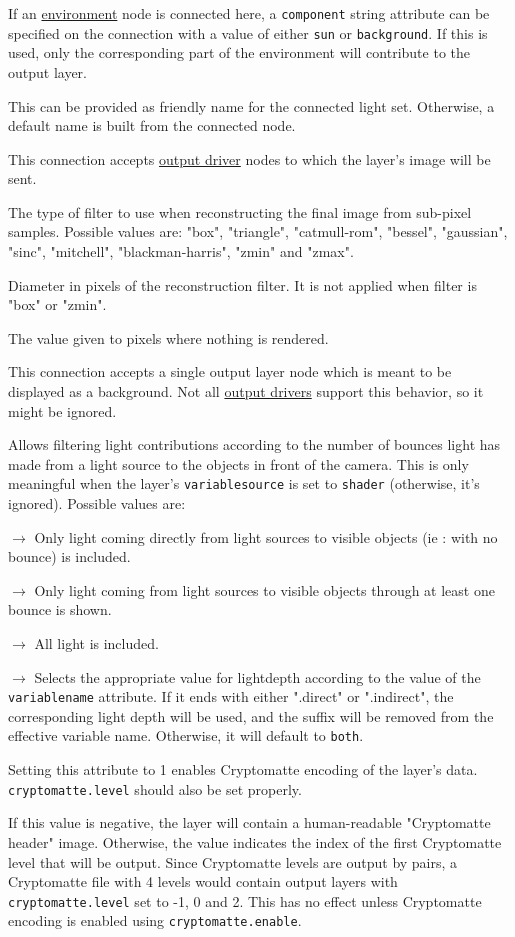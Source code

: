 \documentclass[oneside,ebook]{memoir}
\newcommand{\paramlistitemTN}[2]{\item[#2\textcolor{lightgray}{\dotfill}#1]}
\newcommand{\paramlistitemTND}[3]{\paramlistitemTN{#1 {\rmfamily({\ttfamily#3})}}{#2}}
\newcommand{\paramvalueitem}[1]{\item[#1]$\rightarrow$}
\begin{document}
\begin{paramlist}
If an \hyperref[section:environmentnode]{environment} node is connected here, a \lstinline|component| string attribute can be specified on the connection with a value of either \lstinline|sun| or \lstinline|background|. If this is used, only the corresponding part of the environment will contribute to the output layer.
\paramlistitemTN{string}{lightsetname}
This can be provided as friendly name for the connected light set. Otherwise, a default name is built from the connected node.
\paramlistitemTN{<connection>}{outputdrivers}
This connection accepts \hyperref[section:outputdrivernode]{output driver} nodes to which the layer's image will be sent.
\paramlistitemTND{string}{filter}{blackman-harris}
The type of filter to use when reconstructing the final image from sub-pixel samples. Possible values are: "box", "triangle", "catmull-rom", "bessel", "gaussian", "sinc", "mitchell", "blackman-harris", "zmin" and "zmax".
\paramlistitemTND{double}{filterwidth}{3.0}
Diameter in pixels of the reconstruction filter. It is not applied when filter is "box" or "zmin".
\paramlistitemTND{float}{backgroundvalue}{0}
The value given to pixels where nothing is rendered.
\paramlistitemTN{<connection>}{backgroundlayer}
This connection accepts a single output layer node which is meant to be displayed as a background.
Not all \hyperref[section:outputdrivernode]{output drivers} support this behavior, so it might be ignored.
\paramlistitemTND{string}{lightdepth}{auto}
Allows filtering light contributions according to the number of bounces light has made from a light source to the objects in front of the camera.
This is only meaningful when the layer's \lstinline|variablesource| is set to \lstinline|shader| (otherwise, it's ignored).
Possible values are:
\begin{paramvaluelist}
\paramvalueitem{direct}
Only light coming directly from light sources to visible objects (ie : with no bounce) is included.
\paramvalueitem{indirect}
Only light coming from light sources to visible objects through at least one bounce is shown.
\paramvalueitem{both}
All light is included.
\paramvalueitem{auto}
Selects the appropriate value for lightdepth according to the value of the \lstinline|variablename| attribute.
If it ends with either ".direct" or ".indirect", the corresponding light depth will be used, and the suffix will be removed from the effective variable name.
Otherwise, it will default to \lstinline|both|.
\end{paramvaluelist}
\paramlistitemTND{int}{cryptomatte.enable}{0}
Setting this attribute to 1 enables Cryptomatte encoding of the layer's data.
\lstinline|cryptomatte.level| should also be set properly.
\paramlistitemTND{int}{cryptomatte.level}{0}
If this value is negative, the layer will contain a human-readable "Cryptomatte header" image.
Otherwise, the value indicates the index of the first Cryptomatte level that will be output.
Since Cryptomatte levels are output by pairs, a Cryptomatte file with 4 levels would contain output layers with \lstinline|cryptomatte.level| set to -1, 0 and 2.
This has no effect unless Cryptomatte encoding is enabled using \lstinline|cryptomatte.enable|.
\end{paramlist}
\end{document}
